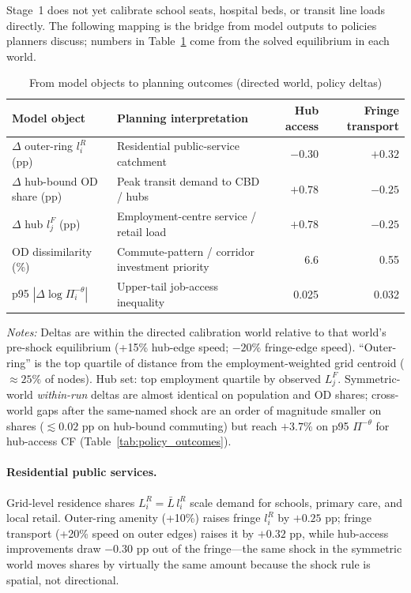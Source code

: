 \documentclass[12pt]{article}
\newcommand{\Lbar}{\bar L}
\begin{document}
Stage~1 does not yet calibrate school seats, hospital beds, or transit line loads
directly.
The following mapping is the bridge from model outputs to policies planners discuss;
numbers in Table~\ref{tab:outcomes} come from the solved equilibrium in each world.

\begin{table}[htbp]
  \centering
  \caption{From model objects to planning outcomes (directed world, policy deltas)}
  \label{tab:outcomes}
  \small
  \begin{tabular}{p{}p{}rr}
  \toprule
  Model object & Planning interpretation & Hub access & Fringe transport \\
  \midrule
  $\Delta$ outer-ring $l_i^R$ (pp) & Residential public-service catchment & $-0.30$ & $+0.32$ \\
  $\Delta$ hub-bound OD share (pp) & Peak transit demand to CBD / hubs & $+0.78$ & $-0.25$ \\
  $\Delta$ hub $l_j^F$ (pp) & Employment-centre service / retail load & $+0.78$ & $-0.25$ \\
  OD dissimilarity (\%) & Commute-pattern / corridor investment priority & 6.6 & 0.55 \\
  p95 $|\Delta\log\Pi_i^{-\theta}|$ & Upper-tail job-access inequality & 0.025 & 0.032 \\
  \bottomrule
  \end{tabular}
  \vspace{0.4em}

  \begin{minipage}{0.92\textwidth}
  \footnotesize
  \emph{Notes:} Deltas are within the directed calibration world relative to that
  world's pre-shock equilibrium (+15\% hub-edge speed; $-20\%$ fringe-edge speed).
  ``Outer-ring'' is the top quartile of distance from the employment-weighted grid
  centroid ($\approx 25\%$ of nodes). Hub set: top employment quartile by observed
  $L_j^F$. Symmetric-world \emph{within-run} deltas are almost identical on population
  and OD shares; cross-world gaps after the same-named shock are an order of magnitude
  smaller on shares ($\lesssim 0.02$ pp on hub-bound commuting) but reach
  $+3.7\%$ on p95 $\Pi^{- \theta}$ for hub-access CF (Table~\ref{tab:policy_outcomes}).
  \end{minipage}
\end{table}

\paragraph{Residential public services.}
Grid-level residence shares $L_i^R=\Lbar\,l_i^R$ scale demand for schools, primary care,
and local retail.
Outer-ring amenity (+10\%) raises fringe $l_i^R$ by $+0.25$ pp; fringe transport
(+20\% speed on outer edges) raises it by $+0.32$ pp, while hub-access improvements
draw $-0.30$ pp out of the fringe---the same shock in the symmetric world moves shares
by virtually the same amount because the shock rule is spatial, not directional.
\end{document}
